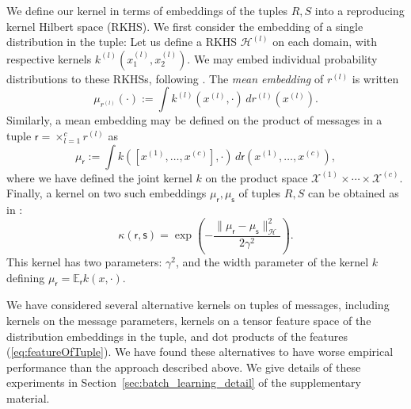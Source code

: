 \documentclass[english]{article}
\theoremstyle{plain}
\theoremstyle{plain}
\newcommand{\secref}[1]{Section~\ref{#1}}
\begin{document}


We define our kernel in terms of embeddings of the tuples $R,S$ into a reproducing kernel Hilbert space (RKHS). We first consider the embedding of a single distribution
in the tuple: Let us define a RKHS
$\mathcal{H}^{(l)}$ on each domain, with respective kernels $k^{(l)}(x^{(l)}_1,x^{(l)}_2)$.
We may embed individual probability distributions to these RKHSs, following \citep{Smola2007}.
The {\em mean embedding} of $r^{(l)}$ is written
\begin{equation}
\mu_{r^{(l)}}(\cdot) := \int k^{(l)}(x^{(l)},\cdot) \, dr^{(l)} (x^{(l)}).
\end{equation}
%
Similarly, a mean embedding may be defined on the product of  messages in a tuple
$\mathsf{r}=\times_{l=1}^{c}r^{(l)}$ as
%
\begin{equation}
\mu_{\mathsf{r}}
:=
\int k([x^{(1)}, \ldots, x^{(c)}],\cdot) \, d\mathsf{r}(x^{(1)}, \ldots, x^{(c)}),
\label{eq:featureOfTuple}
\end{equation}
where we have defined the joint kernel $k$ on the product space
$\mathcal{X}^{(1)}\times\cdots\times\mathcal{X}^{(c)}$.
Finally,  a kernel on two such embeddings $\mu_{\mathsf{r}},\mu_{\mathsf{s}}$ of tuples $R,S$ can be obtained as in \citet[eq. 9]{Christmann2010}:
%
\begin{equation}
\kappa(\mathsf{r}, \mathsf{s}) = \exp\left(-\frac{\|\mu_{\mathsf{r}}-\mu_{\mathsf{s}}\|_{\mathcal{H}}^{2}}{2\gamma^{2}}\right).
\label{eq:gauss_joint_emb}
\end{equation}
%
This kernel has two parameters: $\gamma^{2}$, and the width parameter of the kernel $k$ defining $\mu_{\mathsf{r}} = \mathbb{E}_{\mathsf{r}}k(x,\cdot)$.

We have considered several alternative kernels on tuples of messages, including
kernels on the message parameters, kernels on a tensor feature space of the
distribution embeddings in the tuple, and dot products of the features
(\ref{eq:featureOfTuple}). We have found these alternatives to have worse
empirical performance than the approach described above. We give details of
these experiments in \secref{sec:batch_learning_detail} of the
supplementary material.
\end{document}
